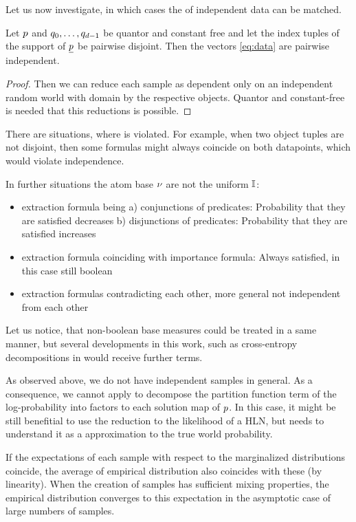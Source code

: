 
Let us now investigate, in which cases the  of independent data can be matched.

\begin{lemma}
    Let $p$ and $q_{0},\ldots,q_{d-1}$ be quantor and constant free and let the index tuples of the support of $\underline{p}$ be pairwise disjoint.
    Then the vectors \eqref{eq:data} are pairwise independent.
\end{lemma}
\begin{proof}
    Then we can reduce each sample as dependent only on an independent random world with domain by the respective objects.
    Quantor and constant-free is needed that this reductions is possible.
\end{proof}


There are situations, where  is violated.
For example, when two object tuples are not disjoint, then some formulas might always coincide on both datapoints, which would violate independence.

In further situations the atom base $\nu$ are not the uniform $\mathbb{I}$:
\begin{itemize}
    \item extraction formula being a) conjunctions of predicates: Probability that they are satisfied decreases
    b) disjunctions of predicates: Probability that they are satisfied increases
    \item extraction formula coinciding with importance formula: Always satisfied, in this case still boolean
    \item extraction formulas contradicting each other, more general not independent from each other
\end{itemize}

Let us notice, that non-boolean base measures could be treated in a same manner, but several developments in this work, such as cross-entropy decompositions in  would receive further terms.



\begin{remark}
    As observed above, we do not have independent samples in general.
    As a consequence, we cannot apply  to decompose the partition function term of the log-probability into factors to each solution map of $p$.
    In this case, it might be still benefitial to use the reduction to the likelihood of a HLN, but needs to understand it as a approximation to the true world probability.

    If the expectations of each sample with respect to the marginalized distributions coincide, the average of empirical distribution also coincides with these (by linearity).
    When the creation of samples has sufficient mixing properties, the empirical distribution converges to this expectation in the asymptotic case of large numbers of samples.

\end{remark}



